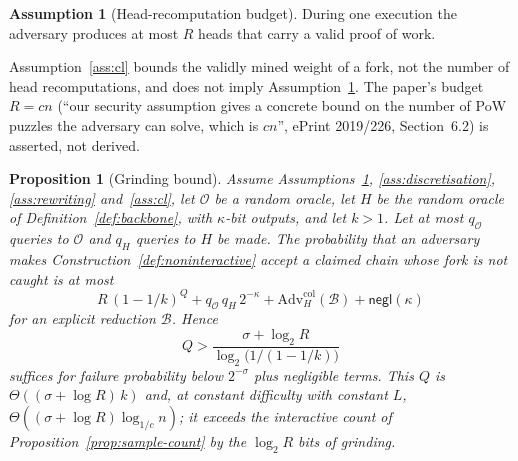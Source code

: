 \documentclass[11pt,a4paper]{article}
\newtheorem{proposition}[theorem]{Proposition}
\theoremstyle{definition}
\newtheorem{assumption}[theorem]{Assumption}
\newcommand{\negl}{\mathsf{negl}}
\begin{document}
\begin{assumption}[Head-recomputation budget]\label{ass:recompute-budget}
During one execution the adversary produces at most $R$ heads that carry a
valid proof of work.
\end{assumption}

Assumption~\ref{ass:cl} bounds the validly mined weight of a fork, not the
number of head recomputations, and does not imply
Assumption~\ref{ass:recompute-budget}. The paper's budget $R=cn$ (``our
security assumption gives a concrete bound on the number of PoW puzzles the
adversary can solve, which is $cn$'', ePrint 2019/226, Section~6.2) is
asserted, not derived.

\begin{proposition}[Grinding bound]\label{prop:grinding}
Assume Assumptions~\ref{ass:recompute-budget}, \ref{ass:discretisation},
\ref{ass:rewriting} and~\ref{ass:cl}, let $\mathcal{O}$ be a random oracle,
let $H$ be the random oracle of Definition~\ref{def:backbone}, with $\kappa$-bit
outputs, and let $k>1$. Let at most $q_{\mathcal{O}}$ queries to $\mathcal{O}$
and $q_H$ queries to $H$ be made. The probability that an adversary makes
Construction~\ref{def:noninteractive} accept a claimed chain whose fork is
not caught is at most
\[
  R\,(1-1/k)^Q+q_{\mathcal{O}}\,q_H\,2^{-\kappa}
  +\mathrm{Adv}^{\mathrm{col}}_H(\mathcal{B})+\negl(\kappa)
\]
for an explicit reduction $\mathcal{B}$. Hence
\[
  Q>\frac{\sigma+\log_2 R}{\log_2\bigl(1/(1-1/k)\bigr)}
\]
suffices for failure probability below $2^{-\sigma}$ plus negligible terms.
This $Q$ is $\Theta((\sigma+\log R)\,k)$ and, at constant difficulty with
constant $L$, $\Theta((\sigma+\log R)\log_{1/c}n)$; it exceeds the interactive
count of Proposition~\ref{prop:sample-count} by the $\log_2 R$ bits of grinding.
\end{proposition}
\end{document}
